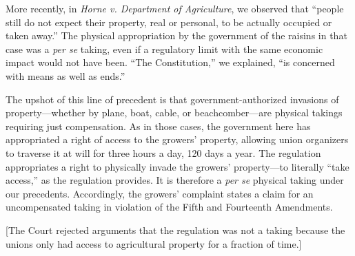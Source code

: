 More recently, in \textit{Horne v. Department of Agriculture}, we
observed that ``people still do not expect their property, real or personal, to
be actually occupied or taken away.'' The physical appropriation by the
government of the raisins in that case was a \textit{per se} taking, even if a
regulatory limit with the same economic impact would not have been. ``The
Constitution,'' we explained, ``is concerned with means as well as ends.'' 

The upshot of this line of precedent is that government-authorized invasions of
property---whether by plane, boat, cable, or beachcomber---are physical takings
requiring just compensation. As in those cases, the government here has
appropriated a right of access to the growers' property, allowing union
organizers to traverse it at will for three hours a day, 120 days a year. The
regulation appropriates a right to physically invade the growers' property---to
literally ``take access,'' as the regulation provides. It is therefore a
\textit{per se} physical taking under our precedents. Accordingly, the growers'
complaint states a claim for an uncompensated taking in violation of the Fifth
and Fourteenth Amendments.



[The Court rejected arguments that the regulation was not a taking because the
unions only had access to agricultural property for a fraction of time.]

